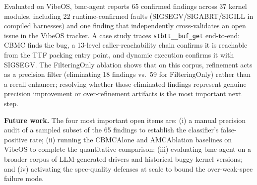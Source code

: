\documentclass[11pt,a4paper]{article}
\newcommand{\tool}{bmc-agent\xspace}
\newcommand{\vibeos}{VibeOS\xspace}
\begin{document}
Evaluated on \vibeos, \tool reports 65 confirmed findings across 37 kernel
modules, including 22 runtime-confirmed faults (SIGSEGV/SIGABRT/SIGILL in
compiled harnesses) and one finding that independently cross-validates an open
issue in the \vibeos tracker. A case study traces \texttt{stbtt\_\_buf\_get}
end-to-end: CBMC finds the bug, a 13-level caller-reachability chain confirms
it is reachable from the TTF packing entry point, and dynamic execution
confirms it with SIGSEGV. The FilteringOnly ablation shows that on this corpus,
refinement acts as a precision filter (eliminating 18 findings vs.\ 59 for
FilteringOnly) rather than a recall enhancer; resolving whether those
eliminated findings represent genuine precision improvement or over-refinement
artifacts is the most important next step.

\smallskip\noindent\textbf{Future work.}
The four most important open items are:
(i) a manual precision audit of a sampled subset of the 65 findings to
establish the classifier's false-positive rate;
(ii) running the CBMCAlone and AMCAblation baselines on \vibeos to complete
the quantitative comparison;
(iii) evaluating \tool on a broader corpus of LLM-generated drivers and
historical buggy kernel versions; and
(iv) activating the spec-quality defenses at scale to bound the over-weak-spec
failure mode.



\end{document}
